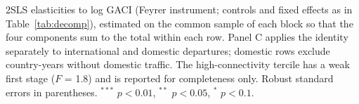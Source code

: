 \begin{table}[htbp]
\begin{threeparttable}
\begin{tabular}{lccccccc}
\bottomrule
\end{tabular}
\begin{tablenotes}\scriptsize
\item 2SLS elasticities to log GACI (Feyrer instrument; controls and fixed effects as in Table~\ref{tab:decomp}), estimated on the common sample of each block so that the four components sum to the total within each row. Panel C applies the identity separately to international and domestic departures; domestic rows exclude country-years without domestic traffic. The high-connectivity tercile has a weak first stage ($F$ = 1.8) and is reported for completeness only. Robust standard errors in parentheses. $^{***}$ $p<0.01$, $^{**}$ $p<0.05$, $^{*}$ $p<0.1$.
\end{tablenotes}
\end{threeparttable}
\end{table}
